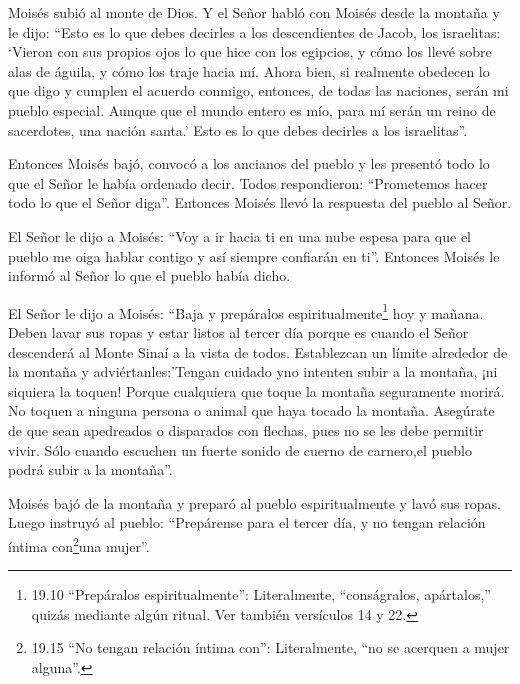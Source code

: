  Moisés subió al monte de Dios. Y el Señor habló con Moisés
desde la montaña y le dijo: ``Esto es lo que debes decirles a los
descendientes de Jacob, los israelitas:  `Vieron con sus
propios ojos lo que hice con los egipcios, y cómo los llevé sobre alas
de águila, y cómo los traje hacia mí.  Ahora bien, si
realmente obedecen lo que digo y cumplen el acuerdo conmigo, entonces,
de todas las naciones, serán mi pueblo especial. Aunque que el mundo
entero es mío,  para mí serán un reino de sacerdotes, una
nación santa.' Esto es lo que debes decirles a los israelitas''.

 Entonces Moisés bajó, convocó a los ancianos del pueblo y
les presentó todo lo que el Señor le había ordenado decir. 
Todos respondieron: ``Prometemos hacer todo lo que el Señor diga''.
Entonces Moisés llevó la respuesta del pueblo al Señor.

 El Señor le dijo a Moisés: ``Voy a ir hacia ti en una nube
espesa para que el pueblo me oiga hablar contigo y así siempre confiarán
en ti''. Entonces Moisés le informó al Señor lo que el pueblo había
dicho.

 El Señor le dijo a Moisés: ``Baja y prepáralos
espiritualmente\footnote{19.10 ``Prepáralos espiritualmente'':
  Literalmente, ``conságralos, apártalos,'' quizás mediante algún
  ritual. Ver también versículos 14 y 22.} hoy y mañana. Deben lavar sus
ropas  y estar listos al tercer día porque es cuando el
Señor descenderá al Monte Sinaí a la vista de todos. 
Establezcan un límite alrededor de la montaña y adviértanles:'Tengan
cuidado yno intenten subir a la montaña, ¡ni siquiera la toquen! Porque
cualquiera que toque la montaña seguramente morirá. No toquen a ninguna
persona o animal que haya tocado la montaña.  Asegúrate de
que sean apedreados o disparados con flechas, pues no se les debe
permitir vivir. Sólo cuando escuchen un fuerte sonido de cuerno de
carnero,el pueblo podrá subir a la montaña''.

 Moisés bajó de la montaña y preparó al pueblo
espiritualmente y lavó sus ropas.  Luego instruyó al
pueblo: ``Prepárense para el tercer día, y no tengan relación íntima
con\footnote{19.15 ``No tengan relación íntima con'': Literalmente, ``no
  se acerquen a mujer alguna''.}una mujer''.

